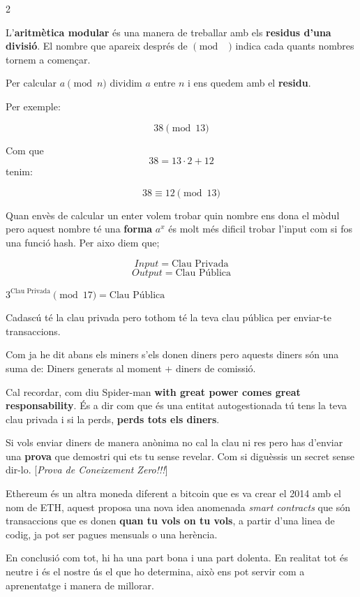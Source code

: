\documentclass[12pt]{article}
\begin{document}
\begin{examplebox}{2}

L'\textbf{aritmètica modular} és una manera de treballar amb els \textbf{residus d'una divisió}. El nombre que apareix després de $\pmod{\phantom{x}}$ indica cada quants nombres tornem a començar.

Per calcular $a \pmod n$ dividim $a$ entre $n$ i ens quedem amb el \textbf{residu}.

Per exemple:

$$38 \pmod{13}$$

Com que $$38 = 13\cdot2+12$$ tenim:

$$\boxed{38\equiv12\pmod{13}}$$

Quan envès de calcular un enter volem trobar quin nombre ens dona el mòdul pero aquest nombre té una \textbf{forma} $a^x$ és molt més dificil trobar l'input com si fos una funció hash. Per aixo diem que;

\[Input = \text{Clau Privada}\]
\[Output = \text{Clau Pública}\]

$3^{\text{Clau Privada}} \pmod 17 = \text{Clau Pública}$

Cadascú té la clau privada pero tothom té la teva clau pública per enviar-te transaccions. 

\end{examplebox}

Com ja he dit abans els miners s'els donen diners pero aquests diners són una suma de: Diners generats al moment + diners de comissió.

Cal recordar, com diu Spider-man \textbf{with great power comes great responsability}. És a dir com que és una entitat autogestionada tú tens la teva clau privada i si la perds, \textbf{perds tots els diners}.

Si vols enviar diners de manera anònima no cal la clau ni res pero has d'enviar una \textbf{prova} que demostri qui ets tu sense revelar. Com si diguèssis un secret sense dir-lo. [\textit{Prova de Coneixement Zero!!!}]

Ethereum és un altra moneda diferent a bitcoin que es va crear el 2014 amb el nom de ETH, aquest proposa una nova idea anomenada \textit{smart contracts} que són transaccions que es donen \textbf{quan tu vols on tu vols}, a partir d'una linea de codig, ja pot ser pagues mensuals o una herència.

En conclusió com tot, hi ha una part bona i una part dolenta. En realitat tot és neutre i és el nostre ús el que ho determina, això ens pot servir com a aprenentatge i manera de millorar.
\end{document}
